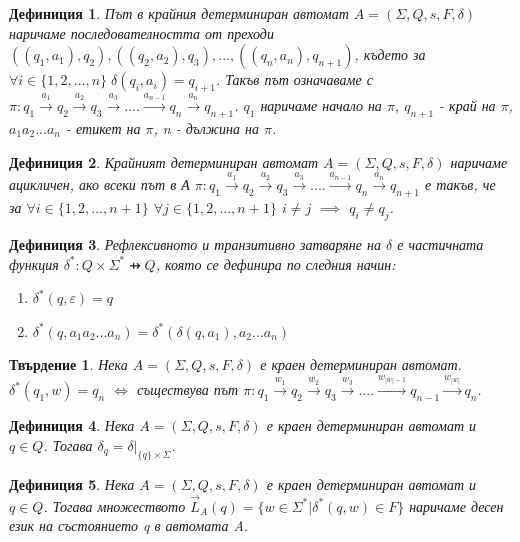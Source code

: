 \documentclass[a4paper,12pt]{article}
\newtheorem{stm}{Твърдение}[section]
\newtheorem{defn}{Дефиниция}[section]
\begin{document}
\begin{defn}
Път в крайния детерминиран автомат $A = ( \Sigma, Q, s, F, \delta )$ наричаме последователността от преходи
$((q_1, a_1), q_2), ((q_2, a_2), q_3), ..., ((q_n, a_n), q_{n+1})$, където за $\forall i \in \{1, 2, ..., n\} \;\delta(q_i, a_i)=q_{i+1}$.
Такъв път означаваме с $\pi: q_1 \xrightarrow{a_1} q_2 \xrightarrow{a_2} q_3 \xrightarrow{a_3} .... \xrightarrow{a_{n  - 1}} q_n \xrightarrow{a_n} q_{n+1}$.
$q_1$ наричаме начало на $\pi$, $q_{n + 1}$ - край на $\pi$, $a_1a_2...a_n$ - етикет на $\pi$, n - дължина на $\pi$.
\end{defn}

\begin{defn}
Крайният детерминиран автомат $A = ( \Sigma, Q, s, F, \delta )$ наричаме ацикличен, ако всеки път в А
$\pi: q_1 \xrightarrow{a_1} q_2 \xrightarrow{a_2} q_3 \xrightarrow{a_3} .... \xrightarrow{a_{n  - 1}} q_n \xrightarrow{a_n} q_{n+1}$
е такъв, че за $\forall i \in \{1, 2, ..., n+1\}$ $\forall j \in \{1, 2, ..., n+1\}$ $i \neq j$ $\implies$ $q_i \neq q_j$.
\end{defn}

\begin{defn}
Рефлексивното и транзитивно затваряне на $\delta$ е частичната функция $\delta^* : Q \times \Sigma^* \pfun Q $, която се дефинира по следния начин:
\begin{enumerate}
 \item[1)] $\delta^*(q, \varepsilon) = q$
 \item[2)] $\delta^*(q, a_1a_2...a_n) = \delta^*(\delta(q, a_1), a_2...a_n)$
\end{enumerate}
\end{defn}

\begin{stm}
Нека $A = (\Sigma, Q, s, F, \delta)$ е краен детерминиран автомат. \\$\delta^*(q_1, w) = q_n$ $\Leftrightarrow$ съществува път
$\pi: q_1 \xrightarrow{w_1} q_2 \xrightarrow{w_2} q_3 \xrightarrow{w_3} .... \xrightarrow{w_{|w| - 1}} q_{n - 1} \xrightarrow{w_{|w|}} q_n$.
\end{stm}

\begin{defn}
Нека $A = (\Sigma, Q, s, F, \delta)$ е краен детерминиран автомат и $q \in Q$. Тогава $\delta_q = \left.{\delta}\right|_{\{q\} \times \Sigma}$.
\end{defn}

\begin{defn}
Нека $A = (\Sigma, Q, s, F, \delta)$ е краен детерминиран автомат и $q \in Q$. Тогава множеството
$\vec{L}_A(q) = \{w \in \Sigma^* | \delta^*(q, w) \in F\}$ наричаме десен език на състоянието q в автомата A.
\end{defn}
\end{document}
